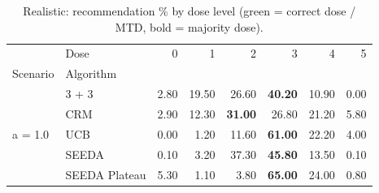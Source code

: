 \begin{table}[H]
\centering
\caption{Realistic: recommendation \% by dose level (green = correct dose / MTD, bold = majority dose).}
\label{tab:real_rec_by_dose}
\begin{tabular}{llrrrrrr}
\toprule
 & Dose & 0 & 1 & 2 & 3 & 4 & 5 \\
Scenario & Algorithm &  &  &  &  &  &  \\
\midrule
\multirow[c]{5}{*}{a = 1.0} & 3 + 3 & 2.80 & 19.50 & {\cellcolor[HTML]{C8E6C9}} 26.60 & \bfseries 40.20 & 10.90 & 0.00 \\
 & CRM & 2.90 & 12.30 & {\cellcolor[HTML]{C8E6C9}} \bfseries 31.00 & 26.80 & 21.20 & 5.80 \\
 & UCB & 0.00 & 1.20 & {\cellcolor[HTML]{C8E6C9}} 11.60 & \bfseries 61.00 & 22.20 & 4.00 \\
 & SEEDA & 0.10 & 3.20 & {\cellcolor[HTML]{C8E6C9}} 37.30 & \bfseries 45.80 & 13.50 & 0.10 \\
 & SEEDA Plateau & 5.30 & 1.10 & {\cellcolor[HTML]{C8E6C9}} 3.80 & \bfseries 65.00 & 24.00 & 0.80 \\
\bottomrule
\end{tabular}
\end{table}
